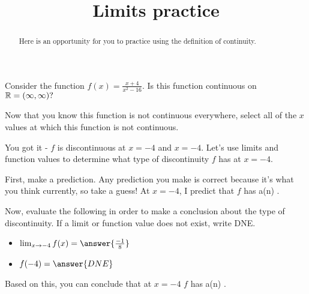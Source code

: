 \documentclass[handout]{ximera}
\title{Limits practice}
\begin{document}
\begin{abstract}
Here is an opportunity for you to practice using the definition of continuity. 
\end{abstract}
\maketitle

\begin{exercise}

Consider the function $f(x) = \frac{x+4}{x^2-16}.$  Is this function continuous on $\mathbb R = (\infty, \infty)?$  

\begin{multipleChoice}
\end{multipleChoice}

\begin{exercise}
Now that you know this function is not continuous everywhere, select all of the $x$ values at which this function is not continuous. 

\begin{selectAll}
\end{selectAll}

\begin{exercise}

You got it - $f$ is discontinuous at $x=-4$ and $x=-4$.  Let's use limits and function values to determine what type of discontinuity $f$ has at $x=-4$.

First, make a prediction.  Any prediction you make is correct because it's what you think currently, so take a guess!  At $x=-4$, I predict that $f$ has a(n) .  

Now, evaluate the following in order to make a conclusion about the type of discontinuity.  If a limit or function value does not exist, write DNE.

\begin{itemize}

\item $\lim_{x \to -4} f(x) = \answer{\frac{-1}{8}}$

\item $f(-4) = \answer{DNE}$

\end{itemize}

Based on this, you can conclude that at $x=-4$ $f$ has a(n) .  

\end{exercise}
\end{exercise}
\end{exercise}
\end{document}

